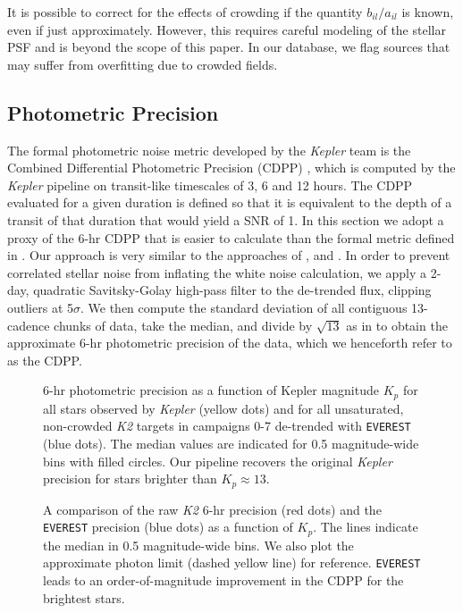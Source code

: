 \documentclass[]{emulateapj}
\begin{document}
It is possible to correct for the effects of crowding if the quantity $b_{il}/a_{il}$
is known, even if just approximately. However, this requires careful modeling of the
stellar PSF and is beyond the scope of this paper. In our database, we flag sources
that may suffer from overfitting due to crowded fields.

\subsection{Photometric Precision}
\label{sec:precision}
The formal photometric noise metric developed by the \emph{Kepler} team is the
Combined Differential Photometric Precision (CDPP) \citep{CHR12}, which is computed
by the \emph{Kepler} pipeline on transit-like timescales of 3, 6 and 12 hours.
The CDPP evaluated for a given duration is defined so that it is equivalent to the 
depth of a transit of that duration that would yield a SNR of 1. In this section we adopt a proxy 
of the 6-hr CDPP that is easier to calculate than
the formal metric defined in \cite{CHR12}. Our approach is very similar to the approaches
of \cite{GIL11}, \cite{VJ14} and \cite{AIG16}. In order to prevent correlated stellar
noise from inflating the white noise calculation, we apply a 2-day, quadratic Savitsky-Golay 
\citep{SG64} high-pass filter to the de-trended flux, clipping
outliers at 5$\sigma$. We then compute the standard deviation of all contiguous 13-cadence
chunks of data, take the median, and divide by $\sqrt{13}$ as in \cite{VJ14} to obtain
the approximate 6-hr photometric precision of the data, which we henceforth refer to
as the CDPP.

\label{sec:precision}
\begin{figure}[h]
  \begin{center}
       \caption{6-hr photometric precision as a function of Kepler magnitude $K_p$
                for all stars observed by \emph{Kepler} 
                (yellow dots) and for all unsaturated, non-crowded \emph{K2} targets
                in campaigns 0-7 de-trended with \texttt{EVEREST}
                (blue dots). The median values are indicated
                for 0.5 magnitude-wide bins with filled circles.
                Our pipeline recovers the original \emph{Kepler} precision for stars
                brighter than $K_p \approx 13$.}
     \label{fig:precision1}
  \end{center}
\end{figure}
\begin{figure}[h]
  \begin{center}
       \caption{A comparison of the raw \emph{K2} 6-hr precision (red dots) and the \texttt{EVEREST} 
       precision (blue dots) as a function of $K_p$. The lines
       indicate the median in 0.5 magnitude-wide bins. We also plot the approximate photon
       limit (dashed yellow line) for reference. \texttt{EVEREST} leads to an order-of-magnitude
       improvement in the CDPP for the brightest stars.}
     \label{fig:precision2}
  \end{center}
\end{figure}
\end{document}
